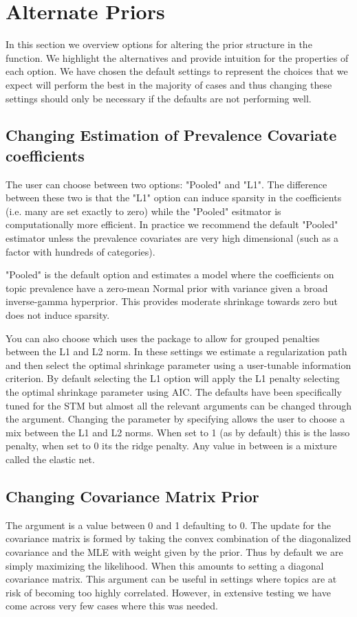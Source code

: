 \documentclass[nojss]{jss}
\begin{document}
\section{Alternate Priors}
In this section we overview options for altering the prior structure in the   function.  We highlight the alternatives and provide intuition for the properties of each option. We have chosen the default settings to represent the choices that we expect will perform  the best in the majority of cases and thus changing these settings should only be necessary if the defaults are not performing well.

\subsection{Changing Estimation of Prevalence Covariate coefficients}
The user can choose between two options: "Pooled" and "L1".   The difference between these two is that the "L1" option can induce sparsity in the coefficients (i.e. many are set exactly to zero) while the "Pooled" esitmator is computationally more efficient.  In practice we recommend the default "Pooled" estimator unless the prevalence covariates are very high dimensional (such as a factor with hundreds of categories).

"Pooled" is the default option and estimates a model where the coefficients on topic prevalence have a zero-mean Normal prior with variance given a broad inverse-gamma hyperprior.  This provides moderate shrinkage towards zero but does not induce sparsity.

You can also choose  which uses the  package \citep{friedman2010regularization} to allow for grouped penalties between the L1 and L2 norm. In these settings we estimate a regularization path and then select the optimal shrinkage parameter using a user-tunable information criterion. By default selecting the L1 option will apply the L1 penalty selecting the optimal shrinkage parameter using AIC. The defaults have been specifically tuned for the STM but almost all the relevant arguments can be changed through the  argument. Changing the  parameter by specifying  allows the user to choose a mix between the L1 and L2 norms. When set to 1 (as by default) this is the lasso penalty, when set to 0 its the ridge penalty. Any value in between is a mixture called the elastic net.

\subsection{Changing Covariance Matrix Prior}
The  argument is a value between 0 and 1 defaulting to 0.  The update for the covariance matrix is formed by taking the convex combination of the diagonalized covariance and the MLE with weight given by the prior.  Thus by default we are simply maximizing the likelihood.  When  this amounts to setting a diagonal covariance matrix.  This argument can be useful in settings where topics are at risk of becoming too highly correlated.  However, in extensive testing we have come across very few cases where this was needed.
\end{document}
